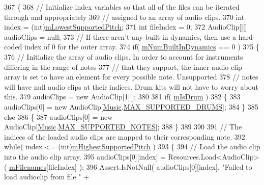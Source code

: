 \begin{DoxyCode}
367     \{
368         \textcolor{comment}{// Initialize index variables so that all of the files can be iterated through and appropriately }
369         \textcolor{comment}{// assigned to an array of audio clips. }
370         \textcolor{keywordtype}{int} index = (int)\hyperlink{group___v_i_base_pro_var_ga3cae52b1bcc0178a8a6b03c7aaf7aac8}{mLowestSupportedPitch};
371         \textcolor{keywordtype}{int} fileIndex = 0;
372         AudioClip[][] audioClips = null;
373         \textcolor{comment}{// If there aren't any built-in dynamics, then use a hard-coded index of 0 for the outer array.}
374         \textcolor{keywordflow}{if}( \hyperlink{group___v_i_base_pro_var_gac265f64f759d267ee1e1680f8d387011}{mNumBuiltInDynamics} == 0 )
375         \{
376             \textcolor{comment}{// Initialize the array of audio clips. In order to account for instruments differing in the
       range of notes }
377             \textcolor{comment}{// that they support, the inner audio clip array is set to have an element for every possible
       note. Unsupported}
378             \textcolor{comment}{// notes will have null audio clips at their indices. Drum kits will not have to worry about
       this.   }
379             audioClips = \textcolor{keyword}{new} AudioClip[1][];
380 
381             \textcolor{keywordflow}{if}( \hyperlink{group___v_i_base_pro_var_ga47dbd8aa02ab32b8f802adfd2d3d81de}{mIsDrum} )
382             \{
383                 audioClips[0] = \textcolor{keyword}{new} AudioClip[\hyperlink{class_music}{Music}.\hyperlink{group___music_constants_gabce1a1ac5b9b6355af6bd7fb3868467a}{MAX\_SUPPORTED\_DRUMS}];
384             \}
385             \textcolor{keywordflow}{else}
386             \{
387                 audioClips[0] = \textcolor{keyword}{new} AudioClip[\hyperlink{class_music}{Music}.\hyperlink{group___music_constants_gaaf07da909a12e9fec0e43b70864f27b7}{MAX\_SUPPORTED\_NOTES}];
388             \}
389 
390 
391             \textcolor{comment}{// The indices of the loaded audio clips are mapped to their corresponding note. }
392             \textcolor{keywordflow}{while}( index <= (\textcolor{keywordtype}{int})\hyperlink{group___v_i_base_pro_var_ga61fb2c33b53a0f663047779d7ceb18f3}{mHighestSupportedPitch} )
393             \{
394                 \textcolor{comment}{// Load the audio clip into the audio clip array.}
395                 audioClips[0][index] = Resources.Load<AudioClip>( \hyperlink{group___v_i_base_pro_var_gab2add474ca506357688b5dd08cac4cb5}{mFilenames}[fileIndex] );
396                 Assert.IsNotNull( audioClips[0][index], \textcolor{stringliteral}{"Failed to load audioclip from file "} + 

\end{DoxyCode}
